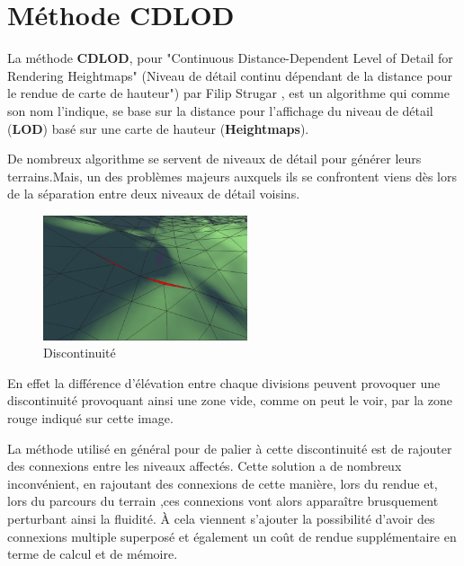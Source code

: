 \chapter{Méthode CDLOD}

  La méthode \textbf{CDLOD}, pour "Continuous Distance-Dependent Level of Detail for Rendering Heightmaps" (Niveau de détail continu dépendant de la distance pour le rendue de carte de hauteur") par Filip Strugar \cite{CDLOD}, 
  est un algorithme qui comme son nom l'indique, se base sur la distance pour l'affichage du niveau de détail 
  (\textbf{LOD}) basé sur une carte de hauteur (\textbf{Heightmaps}).

  De nombreux algorithme se servent de niveaux de détail pour générer leurs terrains.Mais, un des problèmes majeurs auxquels ils se confrontent viens dès lors de la séparation entre deux niveaux de détail voisins.\\
 \begin{figure}
 \includegraphics[width=6cm]{img/seams.png}
   \caption[Discontinuité]{Discontinuité\protect\footnotemark}
   \label{fig:seams}
 \end{figure}
 
 \vspace{0.5cm}
 En effet la différence d'élévation entre chaque divisions peuvent provoquer une discontinuité provoquant ainsi une zone vide, 
 comme on peut le voir, par la zone rouge indiqué sur cette image. 
 
 
 \vspace{2cm}
 La méthode utilisé en général pour de palier à cette discontinuité est de rajouter des connexions entre les niveaux affectés. 
 Cette solution a de nombreux inconvénient, en rajoutant des connexions de cette manière, lors du rendue et, lors du parcours du terrain ,ces connexions vont alors apparaître brusquement perturbant ainsi la fluidité. À cela viennent s'ajouter la possibilité d'avoir des connexions multiple superposé et également un coût de rendue supplémentaire en terme de calcul et de mémoire.
 
